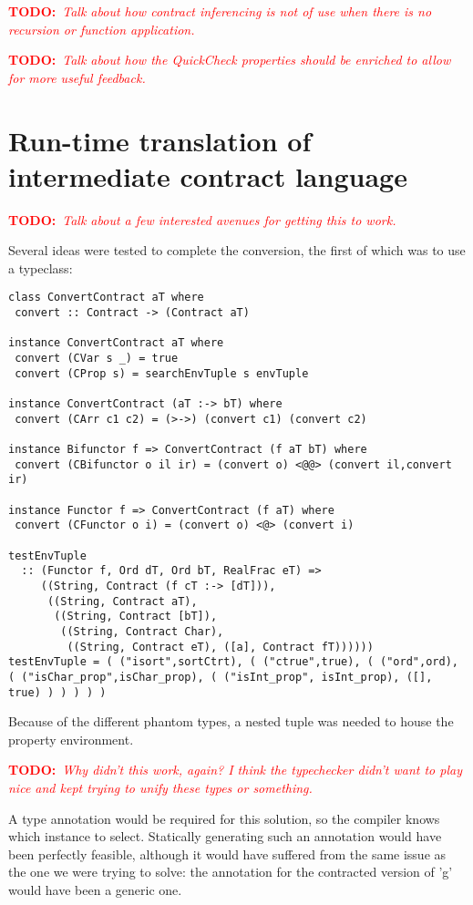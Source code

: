 \documentclass[10pt]{report}
\newcommand{\annotate}[3]{
	\begin{scriptsize}
	\textcolor{#1}{\textbf{#2}~\textit{#3}}
	\end{scriptsize}\newline}
\newcommand{\todo}[1]{\annotate{red} {TODO:} {#1}}
\begin{document}
\todo{Talk about how contract inferencing is not of use when there is no recursion or function application.}

\todo{Talk about how the QuickCheck properties should be enriched to allow for more useful feedback.}



\section{Run-time translation of intermediate contract language}
\label{futurework:runtimetranslation}
\todo{Talk about a few interested avenues for getting this to work.}


Several ideas were tested to complete the conversion, the first of which was to use a typeclass:

\begin{lstlisting}[caption=Attempt at using a typeclass to recover the extra type information.]
class ConvertContract aT where
 convert :: Contract -> (Contract aT)

instance ConvertContract aT where
 convert (CVar s _) = true
 convert (CProp s) = searchEnvTuple s envTuple

instance ConvertContract (aT :-> bT) where
 convert (CArr c1 c2) = (>->) (convert c1) (convert c2)

instance Bifunctor f => ConvertContract (f aT bT) where
 convert (CBifunctor o il ir) = (convert o) <@@> (convert il,convert ir)

instance Functor f => ConvertContract (f aT) where
 convert (CFunctor o i) = (convert o) <@> (convert i)
 
testEnvTuple
  :: (Functor f, Ord dT, Ord bT, RealFrac eT) =>
     ((String, Contract (f cT :-> [dT])),
      ((String, Contract aT),
       ((String, Contract [bT]),
        ((String, Contract Char),
         ((String, Contract eT), ([a], Contract fT))))))
testEnvTuple = ( ("isort",sortCtrt), ( ("ctrue",true), ( ("ord",ord), ( ("isChar_prop",isChar_prop), ( ("isInt_prop", isInt_prop), ([], true) ) ) ) ) )
\end{lstlisting}

Because of the different phantom types, a nested tuple was needed to house the property environment. \todo{Why didn't this work, again? I think the typechecker didn't want to play nice and kept trying to unify these types or something.}

A type annotation would be required for this solution, so the compiler knows which instance to select.
Statically generating such an annotation would have been perfectly feasible, although it would have suffered from the same issue as the one we were trying to solve: 
the annotation for the contracted version of 'g' would have been a generic one.
\end{document}

